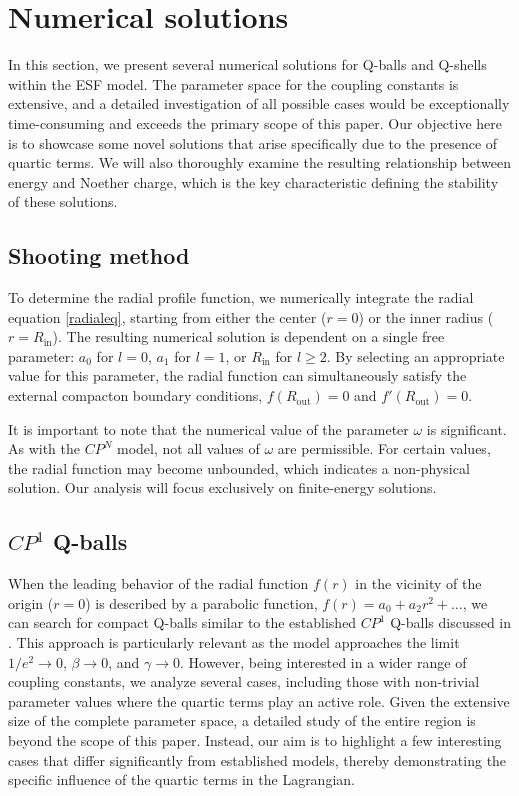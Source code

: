 \documentclass[aps,prd,superscriptaddress,notitlepage,11pt,final,longbibliography,nofootinbib]{revtex4-1}
\numberwithin{equation}{section}
\begin{document}
\section{Numerical solutions}
In this section, we present several numerical solutions for Q-balls and Q-shells within the ESF model. The parameter space for the coupling constants is extensive, and a detailed investigation of all possible cases would be exceptionally time-consuming and exceeds the primary scope of this paper. Our objective here is to showcase some novel solutions that arise specifically due to the presence of quartic terms. We will also thoroughly examine the resulting relationship between energy and Noether charge, which is the key characteristic defining the stability of these solutions.

\subsection{Shooting method}
To determine the radial profile function, we numerically integrate the radial equation \eqref{radialeq}, starting from either the center ($r=0$) or the inner radius ($r=R_{\text{in}}$). The resulting numerical solution is dependent on a single free parameter: $a_0$ for $l=0$, $a_1$ for $l=1$, or $R_{\text{in}}$ for $l\ge 2$. By selecting an appropriate value for this parameter, the radial function can simultaneously satisfy the external compacton boundary conditions, ${f(R_{\text{out}})=0}$ and ${f'(R_{\text{out}})=0}$. 


It is important to note that the numerical value of the parameter $\omega$ is significant. As with the  $CP^N$ model, not all values of $\omega$ are permissible. For certain values, the radial function may become unbounded, which indicates a non-physical solution. Our analysis will focus exclusively on finite-energy solutions.







\subsection{$CP^1$ Q-balls}

When the leading behavior of the radial function $f(r)$ in the vicinity of the origin ($r=0$) is described by a parabolic function, $f(r)=a_0+a_2r^2+\ldots$, we can search for compact Q-balls similar to the established ${C}P^1$ Q-balls discussed in \cite{Klimas:2017eft}. This approach is particularly relevant as the model approaches the limit $1/e^2\to 0$, $\beta\to 0$, and $\gamma\to 0$. However, being interested in a wider range of coupling constants, we analyze several cases, including those with non-trivial parameter values where the quartic terms play an active role. Given the extensive size of the complete parameter space, a detailed study of the entire region is beyond the scope of this paper. Instead, our aim is to highlight a few interesting cases that differ significantly from established models, thereby demonstrating the specific influence of the quartic terms in the Lagrangian.
\end{document}
